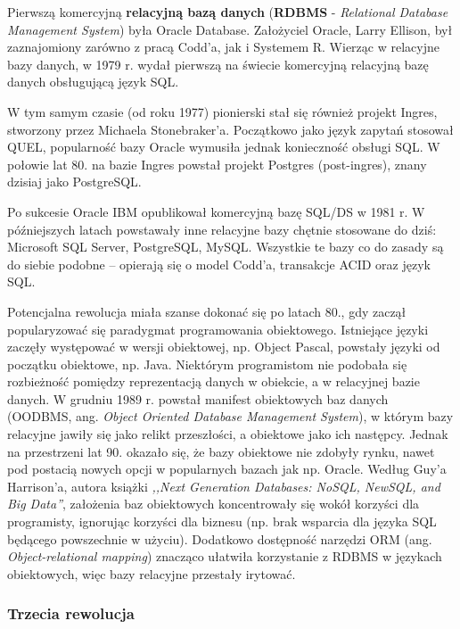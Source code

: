 \documentclass[12pt,a4paper,twoside,titlepage,openright]{book}
\begin{document}
Pierwszą komercyjną \textbf{relacyjną bazą danych} (\textbf{RDBMS} - \textit{Relational Database Management System}) była Oracle Database. Założyciel Oracle, Larry Ellison, był zaznajomiony zarówno z pracą Codd'a, jak i Systemem R. Wierząc w relacyjne bazy danych, w 1979 r. wydał pierwszą na świecie komercyjną relacyjną bazę danych obsługującą język SQL. \cite{relationalDbs}

W tym samym czasie (od roku 1977) pionierski stał się również projekt Ingres, stworzony przez Michaela Stonebraker'a. Początkowo jako język zapytań stosował QUEL, popularność bazy Oracle wymusiła jednak konieczność obsługi SQL. W połowie lat 80. na bazie Ingres powstał projekt Postgres (post-ingres), znany dzisiaj jako PostgreSQL. 

Po sukcesie Oracle IBM opublikował komercyjną bazę SQL/DS w 1981 r. W późniejszych latach powstawały inne relacyjne bazy chętnie stosowane do dziś: Microsoft SQL Server, PostgreSQL, MySQL. Wszystkie te bazy co do zasady są do siebie podobne -- opierają się o model Codd'a, transakcje ACID oraz język SQL. \cite{relationalDbs}

Potencjalna rewolucja miała szanse dokonać się po latach 80., gdy zaczął popularyzować się paradygmat programowania obiektowego. Istniejące języki zaczęły występować w wersji obiektowej, np. Object Pascal, powstały języki od początku obiektowe, np. Java. Niektórym programistom nie podobała się rozbieżność pomiędzy reprezentacją danych w obiekcie, a w relacyjnej bazie danych. W grudniu 1989 r. powstał manifest obiektowych baz danych (OODBMS, ang. \textit{Object Oriented Database Management System}), w którym bazy relacyjne jawiły się jako relikt przeszłości, a obiektowe jako ich następcy.\cite{oodbmsManifesto} Jednak na przestrzeni lat 90. okazało się, że bazy obiektowe nie zdobyły rynku, nawet pod postacią nowych opcji w popularnych bazach jak np. Oracle. Według Guy'a Harrison'a, autora książki \textit{,,Next Generation Databases: NoSQL, NewSQL, and Big Data''}, założenia baz obiektowych koncentrowały się wokół korzyści dla programisty, ignorując korzyści dla biznesu (np. brak wsparcia dla języka SQL będącego powszechnie w użyciu). Dodatkowo dostępność narzędzi ORM (ang. \textit{Object-relational mapping}) znacząco ułatwiła korzystanie z RDBMS w językach obiektowych, więc bazy relacyjne przestały irytować.

\subsubsection{Trzecia rewolucja}
\end{document}
